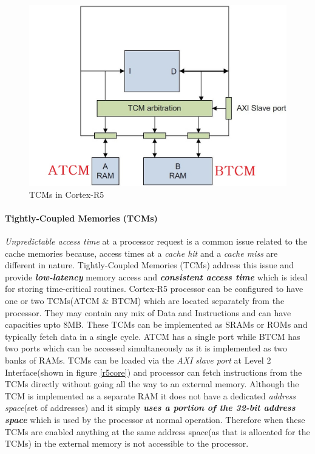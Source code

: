 \documentclass[a4paper,11pt]{article}
\begin{document}
\begin{figure}
	\includegraphics[scale= 0.315]{figures/tcm}
	\caption{TCMs in Cortex-R5} \label{tcm}
\end{figure}
\paragraph{Tightly-Coupled Memories (TCMs)}  \textit{Unpredictable access time} at a processor request is a common issue related to the cache memories because, access times at a \textit{cache hit} and a \textit{cache miss} are different in nature. Tightly-Coupled Memories (TCMs) address this issue and provide \textbf{\textit{low-latency}} memory access and \textbf{\textit{consistent access time}} which is ideal for storing time-critical routines\cite{crspg}. Cortex-R5 processor can be configured to have one or two TCMs(ATCM \& BTCM) which are located separately from the processor. They may contain any mix of Data and Instructions and can have capacities upto 8MB. These TCMs can be implemented as SRAMs or ROMs and typically fetch data in a single cycle. ATCM has a single port while BTCM has two ports which can be accessed simultaneously as it is implemented as two banks of RAMs. TCMs can be loaded via the \textit{AXI slave port} at Level 2 Interface(shown in figure \ref{r5core}) and processor can fetch instructions from the TCMs directly without going all the way to an external memory. Although the TCM is implemented as a separate RAM it does not have a dedicated \textit{address space}(set of addresses) and it simply \textbf{\textit{uses a portion of the 32-bit address space}} which is used by the processor at normal operation. Therefore when these TCMs are enabled anything at the same address space(as that is allocated for the TCMs) in the external memory is not accessible to the processor\cite{crtrm}.
\end{document}
